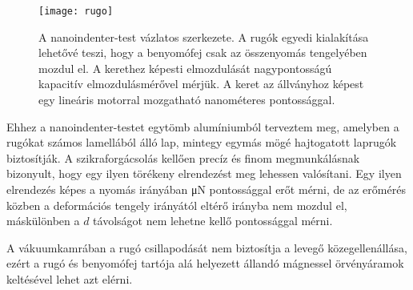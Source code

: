 \renewcommand{\figurename}{Ábra.}
\begin{figure}[htbp!] 
\centering    
\texttt{[image: rugo]}
\caption{A nanoindenter-test vázlatos szerkezete. A rugók egyedi kialakítása lehetővé teszi, hogy a benyomófej csak az összenyomás tengelyében mozdul el. A kerethez képesti elmozdulását nagypontosságú kapacitív elmozdulásmérővel mérjük. A keret az állványhoz képest egy lineáris motorral mozgatható nanométeres pontossággal.}
\label{fig:rugo}
\end{figure}

Ehhez a nanoindenter-testet egytömb alumíniumból terveztem meg, amelyben a rugókat számos lamellából álló lap, mintegy egymás mögé hajtogatott laprugók biztosítják. A szikraforgácsolás kellően precíz és finom megmunkálásnak bizonyult, hogy egy ilyen törékeny elrendezést meg lehessen valósítani. Egy ilyen elrendezés képes a nyomás irányában \si{\micro\newton} pontossággal erőt mérni, de az erőmérés közben a deformációs tengely irányától eltérő irányba nem mozdul el, máskülönben a $d$ távolságot nem lehetne kellő pontossággal mérni.

A vákuumkamrában a rugó csillapodását nem biztosítja a levegő közegellenállása, ezért a rugó és benyomófej tartója alá helyezett állandó mágnessel örvényáramok keltésével lehet azt elérni.

